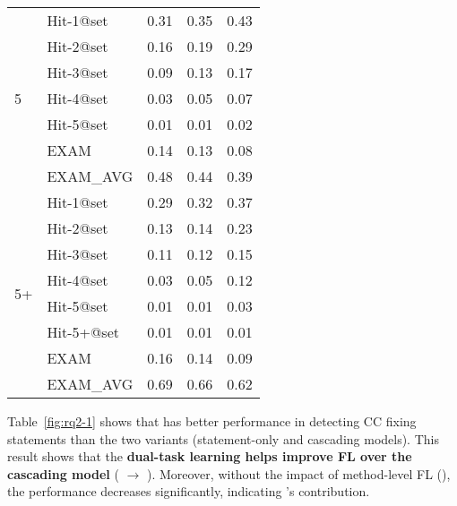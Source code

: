 \begin{table}[b]
{\begin{center}
\begin{tabular}{p{1cm}<{\centering}|p{1.5cm}<{\centering}|p{1.5cm}<{\centering}|p{1.5cm}<{\centering}|p{1.2cm}<{\centering}}
				\hline
				\multirow{7}{*}{5}  & Hit-1@set     & 0.31 & 0.35 & 0.43 \\
									& Hit-2@set     & 0.16 & 0.19 & 0.29 \\
									& Hit-3@set     & 0.09 & 0.13 & 0.17 \\
									& Hit-4@set     & 0.03 & 0.05 & 0.07 \\
									& Hit-5@set     & 0.01 & 0.01 & 0.02 \\
									& EXAM          & 0.14 & 0.13 & 0.08 \\
									& EXAM\_AVG     & 0.48 & 0.44 & 0.39 \\
				\hline
				\multirow{8}{*}{5+}  & Hit-1@set     & 0.29 & 0.32 & 0.37 \\
									& Hit-2@set     & 0.13 & 0.14 & 0.23 \\
									& Hit-3@set     & 0.11 & 0.12 & 0.15 \\
									& Hit-4@set     & 0.03 & 0.05 & 0.12 \\
									& Hit-5@set     & 0.01 & 0.01 & 0.03 \\
									& Hit-5+@set    & 0.01 & 0.01 & 0.01 \\
									& EXAM          & 0.16 & 0.14 & 0.09 \\
									& EXAM\_AVG     & 0.69 & 0.66 & 0.62 \\
				\hline
			\end{tabular}
			
			\label{fig:rq2}
		\end{center}
	}
\end{table}
\fi

Table~\ref{fig:rq2-1} shows that {\tool} has better performance in
detecting CC fixing statements than the two variants (statement-only
and cascading models). This result shows that the {\bf dual-task
learning helps improve FL over the cascading model} (
$\rightarrow$ ). Moreover, without the impact of
method-level FL (), the performance decreases
significantly, indicating 's contribution.


